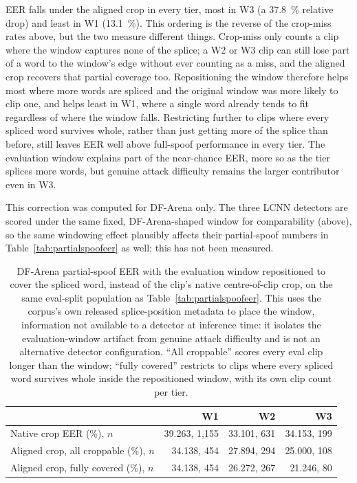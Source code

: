 \documentclass[11pt]{report}
\begin{document}
EER falls under the aligned crop in every tier, most in W3 (a
\SI{37.8}{\percent} relative drop) and least in W1 (\SI{13.1}{\percent}).
This ordering is the reverse of the crop-miss rates above, but the two
measure different things. Crop-miss only counts a clip where the
window captures none of the splice; a W2 or W3 clip can still lose
part of a word to the window's edge without ever counting as a miss,
and the aligned crop recovers that partial coverage too. Repositioning
the window therefore helps most where more words are spliced and the
original window was more likely to clip one, and helps least in W1,
where a single word already tends to fit regardless of where the
window falls. Restricting further to clips where every spliced word
survives whole, rather than just getting more of the splice than
before, still leaves EER well above full-spoof performance in every
tier. The evaluation window explains part of the near-chance EER, more
so as the tier splices more words, but genuine attack difficulty
remains the larger contributor even in W3.

This correction was computed for DF-Arena only. The three LCNN
detectors are scored under the same fixed, DF-Arena-shaped window for
comparability (above), so the same windowing effect plausibly affects
their partial-spoof numbers in Table~\ref{tab:partialspoofeer} as
well; this has not been measured.

\begin{table}[H]
\centering
\caption{DF-Arena partial-spoof EER with the evaluation window
repositioned to cover the spliced word, instead of the clip's native
centre-of-clip crop, on the same eval-split population as
Table~\ref{tab:partialspoofeer}. This uses the corpus's own released
splice-position metadata to place the window, information not
available to a detector at inference time: it isolates the
evaluation-window artifact from genuine attack difficulty and is not
an alternative detector configuration. ``All croppable'' scores every
eval clip longer than the window; ``fully covered'' restricts to
clips where every spliced word survives whole inside the repositioned
window, with its own clip count per tier.}
\label{tab:alignedcrop}
\small
\begin{tabular}{lrrr}
\toprule
\textbf{} & \textbf{W1} & \textbf{W2} & \textbf{W3} \\
\midrule
Native crop EER (\%), $n$          & 39.263, 1{,}155 & 33.101, 631 & 34.153, 199 \\
Aligned crop, all croppable (\%), $n$   & 34.138, 454 & 27.894, 294 & 25.000, 108 \\
Aligned crop, fully covered (\%), $n$   & 34.138, 454 & 26.272, 267 & 21.246, 80 \\
\bottomrule
\end{tabular}
\end{table}
\end{document}
